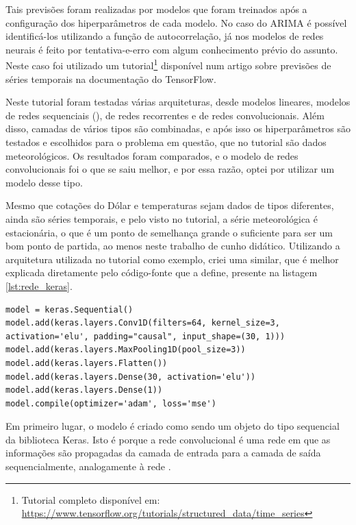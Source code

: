 Tais previsões foram realizadas por modelos que foram treinados após a configuração dos hiperparâmetros de cada modelo. No caso do ARIMA é possível identificá-los utilizando a função de autocorrelação, já nos modelos de redes neurais é feito por tentativa-e-erro com algum conhecimento prévio do assunto. Neste caso foi utilizado um tutorial\footnote{Tutorial completo disponível em: \url{https://www.tensorflow.org/tutorials/structured_data/time_series}} disponível num artigo sobre previsões de séries temporais na documentação do TensorFlow.

Neste tutorial foram testadas várias arquiteturas, desde modelos lineares, modelos de redes sequenciais (), de redes recorrentes e de redes convolucionais. Além disso, camadas de vários tipos são combinadas, e após isso os hiperparâmetros são testados e escolhidos para o problema em questão, que no tutorial são dados meteorológicos. Os resultados foram comparados, e o modelo de redes convolucionais foi o que se saiu melhor, e por essa razão, optei por utilizar um modelo desse tipo.

Mesmo que cotações do Dólar e temperaturas sejam dados de tipos diferentes, ainda são séries temporais, e pelo visto no tutorial, a série meteorológica é estacionária, o que é um ponto de semelhança grande o suficiente para ser um bom ponto de partida, ao menos neste trabalho de cunho didático. Utilizando a arquitetura utilizada no tutorial como exemplo, criei uma similar, que é melhor explicada diretamente pelo código-fonte que a define, presente na listagem \ref{lst:rede_keras}.
\newline
\estiloR
\begin{lstlisting}[caption={Definição da arquitetura da rede neural convolucional}, label={lst:rede_keras}, escapeinside={\%}]
model = keras.Sequential()
model.add(keras.layers.Conv1D(filters=64, kernel_size=3, activation='elu', padding="causal", input_shape=(30, 1)))
model.add(keras.layers.MaxPooling1D(pool_size=3))
model.add(keras.layers.Flatten())
model.add(keras.layers.Dense(30, activation='elu'))
model.add(keras.layers.Dense(1))
model.compile(optimizer='adam', loss='mse')
\end{lstlisting}

Em primeiro lugar, o modelo é criado como sendo um objeto do tipo sequencial da biblioteca Keras. Isto é porque a rede convolucional é uma rede em que as informações são propagadas da camada de entrada para a camada de saída sequencialmente, analogamente à rede .


